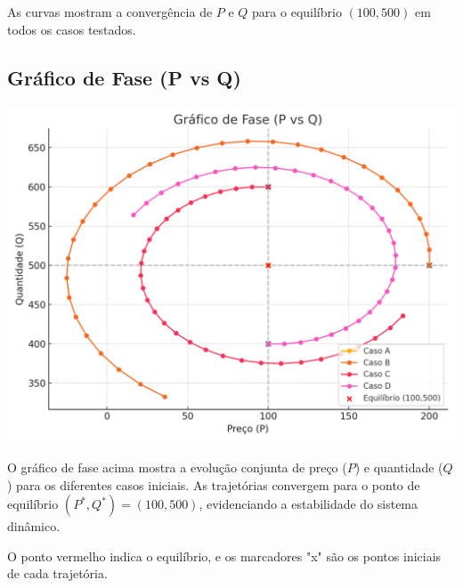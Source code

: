 \documentclass{article}
\begin{document}
As curvas mostram a convergência de $P$ e $Q$ para o equilíbrio $(100,500)$ em todos os casos testados.

\subsection*{Gráfico de Fase (P vs Q)}

\begin{center}
\includegraphics[width=0.7\linewidth]{fase.png}
\end{center}

O gráfico de fase acima mostra a evolução conjunta de preço ($P$) e quantidade ($Q$) para os diferentes casos iniciais.  
As trajetórias convergem para o ponto de equilíbrio $(P^*, Q^*) = (100, 500)$, evidenciando a estabilidade do sistema dinâmico.

O ponto vermelho indica o equilíbrio, e os marcadores "x" são os pontos iniciais de cada trajetória.
\end{document}
